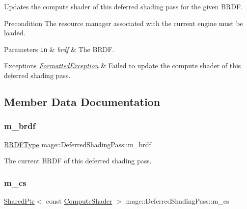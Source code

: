 Updates the compute shader of this deferred shading pass for the given B\+R\+DF.

\begin{DoxyPrecond}{Precondition}
The resource manager associated with the current engine must be loaded. 
\end{DoxyPrecond}

\begin{DoxyParams}[1]{Parameters}
\mbox{\tt in}  & {\em brdf} & The B\+R\+DF. \\
\hline
\end{DoxyParams}

\begin{DoxyExceptions}{Exceptions}
{\em \hyperlink{structmage_1_1_formatted_exception}{Formatted\+Exception}} & Failed to update the compute shader of this deferred shading pass. \\
\hline
\end{DoxyExceptions}


\subsection{Member Data Documentation}
\hypertarget{classmage_1_1_deferred_shading_pass_a5a466f5c2ee71563f4f8ed6d042ee4b3}{}\label{classmage_1_1_deferred_shading_pass_a5a466f5c2ee71563f4f8ed6d042ee4b3} 
\subsubsection{\texorpdfstring{m\+\_\+brdf}{m\_brdf}}
{\footnotesize\ttfamily \hyperlink{namespacemage_ae7a7a03a7b34d7e2689689bb8295cd38}{B\+R\+D\+F\+Type} mage\+::\+Deferred\+Shading\+Pass\+::m\+\_\+brdf\hspace{0.3cm}{\ttfamily [private]}}

The current B\+R\+DF of this deferred shading pass. \hypertarget{classmage_1_1_deferred_shading_pass_a8d3bebdc41d116eb05d9f5a3c923f349}{}\label{classmage_1_1_deferred_shading_pass_a8d3bebdc41d116eb05d9f5a3c923f349} 
\subsubsection{\texorpdfstring{m\+\_\+cs}{m\_cs}}
{\footnotesize\ttfamily \hyperlink{namespacemage_a1e01ae66713838a7a67d30e44c67703e}{Shared\+Ptr}$<$ const \hyperlink{namespacemage_ae040329401484b076f0cd1a7c43d19c9}{Compute\+Shader} $>$ mage\+::\+Deferred\+Shading\+Pass\+::m\+\_\+cs\hspace{0.3cm}{\ttfamily [private]}}


